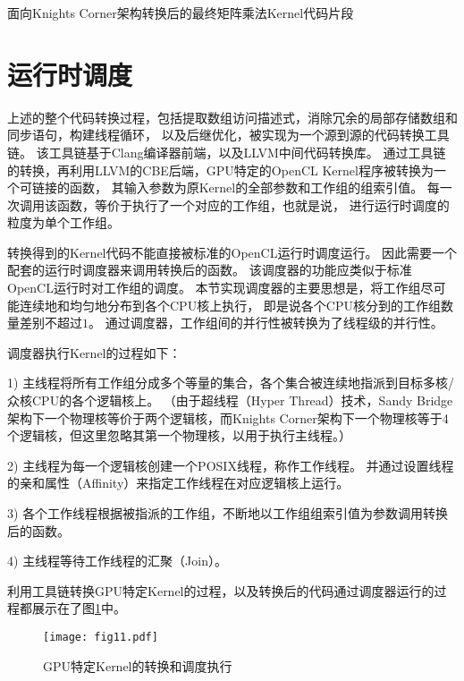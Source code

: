 \begin{table}[htb]
\centering
\caption{面向Knights Corner架构转换后的最终矩阵乘法Kernel代码片段}
\label{micouput}
\end{table}


\section{运行时调度}
\label{runtimesec}
上述的整个代码转换过程，包括提取数组访问描述式，消除冗余的局部存储数组和同步语句，构建线程循环，
以及后继优化，被实现为一个源到源的代码转换工具链。
该工具链基于Clang编译器前端，以及LLVM中间代码转换库。
通过工具链的转换，再利用LLVM的CBE后端，GPU特定的OpenCL Kernel程序被转换为一个可链接的函数，
其输入参数为原Kernel的全部参数和工作组的组索引值。
每一次调用该函数，等价于执行了一个对应的工作组，也就是说，
进行运行时调度的粒度为单个工作组。

转换得到的Kernel代码不能直接被标准的OpenCL运行时调度运行。
因此需要一个配套的运行时调度器来调用转换后的函数。
该调度器的功能应类似于标准OpenCL运行时对工作组的调度。
本节实现调度器的主要思想是，将工作组尽可能连续地和均匀地分布到各个CPU核上执行，
即是说各个CPU核分到的工作组数量差别不超过$1$。
通过调度器，工作组间的并行性被转换为了线程级的并行性。

调度器执行Kernel的过程如下：
\begin{compactitem}
\item[1)]{主线程将所有工作组分成多个等量的集合，各个集合被连续地指派到目标多核/众核CPU的各个逻辑核上。
（由于超线程（Hyper Thread）技术，Sandy Bridge架构下一个物理核等价于两个逻辑核，而Knights Corner架构下一个物理核等于4个逻辑核，但这里忽略其第一个物理核，以用于执行主线程。）}
\item[2)]{主线程为每一个逻辑核创建一个POSIX线程，称作工作线程。
并通过设置线程的亲和属性（Affinity）来指定工作线程在对应逻辑核上运行。}
\item[3)]{各个工作线程根据被指派的工作组，不断地以工作组组索引值为参数调用转换后的函数。}
\item[4)]{主线程等待工作线程的汇聚（Join）。}
\end{compactitem}

利用工具链转换GPU特定Kernel的过程，以及转换后的代码通过调度器运行的过程都展示在了图\ref{sysdiagram}中。

\begin{figure}[htb]
	\centering
	\texttt{[image: fig11.pdf]}
	\caption{GPU特定Kernel的转换和调度执行}
	\label{sysdiagram}
\end{figure}

